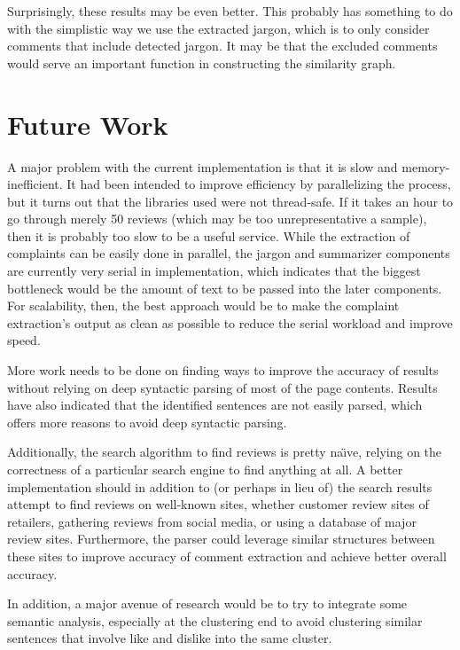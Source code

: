 \documentclass{article}
\begin{document}
Surprisingly, these results may be even better. This probably has something to
do with the simplistic way we use the extracted jargon, which is to only
consider comments that include detected jargon. It may be that the excluded
comments would serve an important function in constructing the similarity
graph.

\section{Future Work}

A major problem with the current implementation is that it is slow and memory-
inefficient. It had been intended to improve efficiency by parallelizing the
process, but it turns out that the libraries used were not thread-safe. If it
takes an hour to go through merely 50 reviews (which may be too unrepresentative
a sample), then it is probably too slow to be a useful service. While the
extraction of complaints can be easily done in parallel, the jargon and
summarizer components are currently very serial in implementation, which
indicates that the biggest bottleneck would be the amount of text to be passed
into the later components. For scalability, then, the best approach would be to
make the complaint extraction's output as clean as possible to reduce the
serial workload and improve speed.

More
work needs to be done on finding ways to improve the accuracy of results
without relying on deep syntactic parsing of most of the page contents. Results
have also indicated that the identified sentences are not easily parsed, which
offers more reasons to avoid deep syntactic parsing.

Additionally, the search algorithm to find reviews is pretty na\"{\i}ve,
relying on the correctness of a particular search engine to find anything at
all. A better implementation should in addition to (or perhaps in lieu of) the
search results attempt to find reviews on well-known sites, whether customer
review sites of retailers, gathering reviews from social media, or using a
database of major review sites. Furthermore, the parser could leverage similar
structures between these sites to improve accuracy of comment extraction and
achieve better overall accuracy.

In addition, a major avenue of research would be to try to integrate some
semantic analysis, especially at the clustering end to avoid clustering similar
sentences that involve like and dislike into the same cluster.
\end{document}
